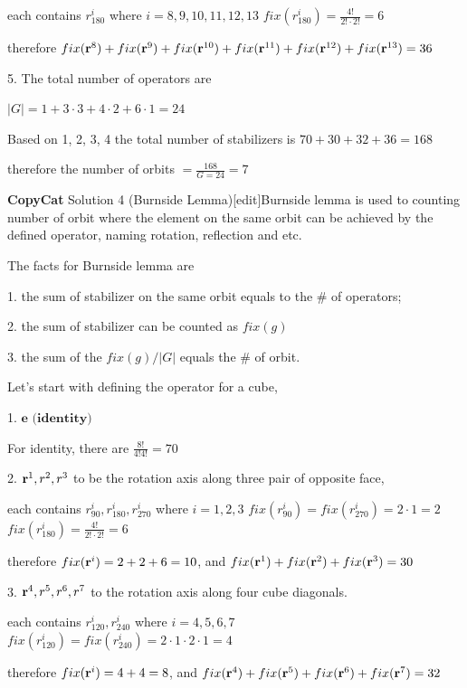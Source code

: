 \begin{enumerate}
 each contains $r^{i}_{180}$   where $i= 8, 9, 10, 11, 12, 13$
$fix(r^{i}_{180}) = \frac{4!}{2!\cdot2!} = 6$

 therefore $fix(\textbf r^{8})+fix(\textbf r^{9})+fix(\textbf r^{10})+fix(\textbf r^{11})+fix(\textbf r^{12})+fix(\textbf r^{13}) = 36$

 
5. The total number of operators are 

 $|G| = 1 + 3\cdot3 + 4\cdot2 + 6\cdot1 = 24$

 Based on 1, 2, 3, 4 the total number of stabilizers is $70 + 30 + 32 + 36 = 168$

 therefore the number of orbits $= \frac{168}{G=24} = \boxed{7}$

 \textbf{CopyCat} Solution 4 (Burnside Lemma)[edit]Burnside lemma is used to counting number of orbit where the element on the same orbit can be achieved by the defined operator, naming rotation, reflection and etc.

 The facts for Burnside lemma are

 1. the sum of stabilizer on the same orbit equals to the \# of operators;

 2. the sum of stabilizer can be counted as $fix(g)$

 3. the sum of the $fix(g)/|G|$ equals the \# of orbit.

 
Let's start with defining the operator for a cube,

 1. $\textbf{e (identity)}$

 For identity, there are $\frac{8!}{4!4!} = 70$

 
2. ${\textbf r^{1}, r^{2}, r^{3}}$ to be the rotation axis along three pair of opposite face,

 each contains $r^{i}_{90}, r^{i}_{180}, r^{i}_{270}$ where $i= 1, 2, 3$
$fix(r^{i}_{90}) = fix(r^{i}_{270}) = 2\cdot1 = 2$
$fix(r^{i}_{180}) = \frac{4!}{2!\cdot2!} = 6$

 therefore $fix(\textbf r^{i}) = 2+2+6 = 10$, and $fix(\textbf r^{1})+fix(\textbf r^{2})+fix(\textbf r^{3}) = 30$

 
3. ${\textbf r^{4}, r^{5}, r^{6}, r^{7}}$ to the rotation axis along four cube diagonals.

 each contains $r^{i}_{120}, r^{i}_{240}$ where $i= 4, 5, 6, 7$
$fix(r^{i}_{120}) = fix(r^{i}_{240}) = 2\cdot1\cdot2\cdot1 = 4$

 therefore $fix(\textbf r^{i}) = 4+4 = 8$, and $fix(\textbf r^{4})+fix(\textbf r^{5})+fix(\textbf r^{6})+fix(\textbf r^{7}) = 32$

 



\end{enumerate}
